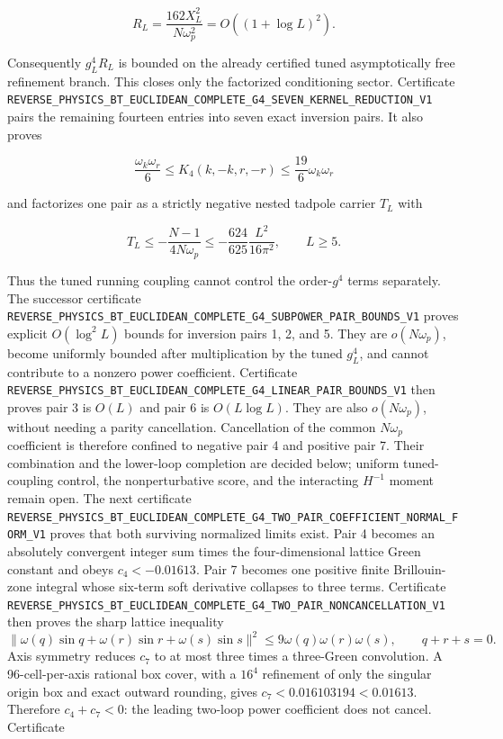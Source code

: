 \documentclass[11pt]{article}
\theoremstyle{definition}
\theoremstyle{remark}
\newcommand{\cert}[1]{\nolinkurl{#1}}
\begin{document}
\[
 R_L=\frac{162X_L^2}{N\omega_p^2}
     =O\!\left((1+\log L)^2\right).
\]

Consequently \(g_L^4R_L\) is bounded on the already certified tuned
asymptotically free refinement branch.  This closes only the factorized
conditioning sector.  Certificate
\cert{REVERSE_PHYSICS_BT_EUCLIDEAN_COMPLETE_G4_SEVEN_KERNEL_REDUCTION_V1}
pairs the remaining fourteen entries into seven exact inversion pairs.  It
also proves

\[
 \frac{\omega_k\omega_r}{6}
 \leq K_4(k,-k,r,-r)
 \leq\frac{19}{6}\omega_k\omega_r
\]

and factorizes one pair as a strictly negative nested tadpole carrier \(T_L\)
with

\[
 T_L\leq-\frac{N-1}{4N\omega_p}
 \leq-\frac{624}{625}\frac{L^2}{16\pi^2},\qquad L\geq5.
\]

Thus the tuned running coupling cannot control the order-\(g^4\) terms
separately.  The successor certificate
\cert{REVERSE_PHYSICS_BT_EUCLIDEAN_COMPLETE_G4_SUBPOWER_PAIR_BOUNDS_V1}
proves explicit \(O(\log^2L)\) bounds for inversion pairs 1, 2, and 5.  They
are \(o(N\omega_p)\), become uniformly bounded after multiplication by the
tuned \(g_L^4\), and cannot contribute to a nonzero power coefficient.
Certificate
\cert{REVERSE_PHYSICS_BT_EUCLIDEAN_COMPLETE_G4_LINEAR_PAIR_BOUNDS_V1}
then proves pair 3 is \(O(L)\) and pair 6 is \(O(L\log L)\).  They are also
\(o(N\omega_p)\), without needing a parity cancellation.  Cancellation of
the common \(N\omega_p\) coefficient is therefore confined to negative pair
4 and positive pair 7.  Their combination and the lower-loop completion are
decided below; uniform tuned-coupling control, the nonperturbative score, and
the interacting \(H^{-1}\) moment remain open.
The next certificate
\cert{REVERSE_PHYSICS_BT_EUCLIDEAN_COMPLETE_G4_TWO_PAIR_COEFFICIENT_NORMAL_FORM_V1}
proves that both surviving normalized limits exist.  Pair 4 becomes an
absolutely convergent integer sum times the four-dimensional lattice Green
constant and obeys \(c_4<-0.01613\).  Pair 7 becomes one positive finite
Brillouin-zone integral whose six-term soft derivative collapses to three
terms.  Certificate
\cert{REVERSE_PHYSICS_BT_EUCLIDEAN_COMPLETE_G4_TWO_PAIR_NONCANCELLATION_V1}
then proves the sharp lattice inequality
\[
 \|\omega(q)\sin q+\omega(r)\sin r+\omega(s)\sin s\|^2
 \leq9\omega(q)\omega(r)\omega(s),\qquad q+r+s=0.
\]
Axis symmetry reduces \(c_7\) to at most three times a three-Green
convolution.  A 96-cell-per-axis rational box cover, with a \(16^4\) refinement
of only the singular origin box and exact outward rounding, gives
\(c_7<0.016103194<0.01613\).  Therefore \(c_4+c_7<0\): the leading two-loop
power coefficient does not cancel.  Certificate
\end{document}
